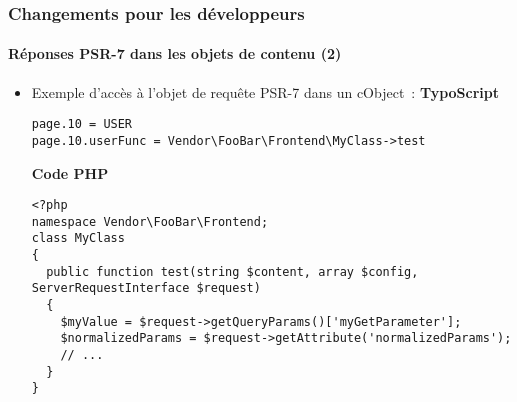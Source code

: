 %

\begin{frame}[fragile]
	\frametitle{Changements pour les développeurs}
	\framesubtitle{Réponses PSR-7 dans les objets de contenu (2)}

	\lstset{basicstyle=\tiny\ttfamily}

	\begin{itemize}
		\item Exemple d'accès à l'objet de requête PSR-7 dans un cObject~:\newline
			\smaller\textbf{TypoScript}\normalsize
\begin{lstlisting}
page.10 = USER
page.10.userFunc = Vendor\FooBar\Frontend\MyClass->test
\end{lstlisting}
			\smaller\textbf{Code PHP}\normalsize
\begin{lstlisting}
<?php
namespace Vendor\FooBar\Frontend;
class MyClass
{
  public function test(string $content, array $config, ServerRequestInterface $request)
  {
    $myValue = $request->getQueryParams()['myGetParameter'];
    $normalizedParams = $request->getAttribute('normalizedParams');
    // ...
  }
}
\end{lstlisting}

	\end{itemize}
\end{frame}

